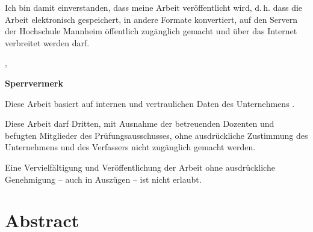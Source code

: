 %
{
\vspace{0.5cm}
Ich bin damit einverstanden, dass meine Arbeit veröffentlicht wird, d.\,h. dass die Arbeit elektronisch gespeichert, in andere Formate konvertiert, auf den Servern der Hochschule Mannheim öffentlich zugänglich gemacht und über das Internet verbreitet werden darf. 
}{}%


\vspace{1cm}
\dhbwort, \dhbwdatum \\

\vspace{1.2cm}						                                      
\dhbwautor

%
{%
\vspace{11cm}
\color{red}\textsf{\large\textbf{Sperrvermerk}}

Diese Arbeit basiert auf internen und vertraulichen Daten des Unternehmens \dhbwfirma.

Diese Arbeit darf Dritten, mit Ausnahme der betreuenden Dozenten und befugten Mitglieder des Prüfungsausschusses, ohne ausdrückliche Zustimmung des Unternehmens und des Verfassers nicht zugänglich gemacht werden.

Eine Vervielfältigung und Veröffentlichung der Arbeit ohne ausdrückliche Genehmigung -- auch in Auszügen -- ist nicht erlaubt.
\color{black}
}{}

\cleardoublepage

\chapter*{Abstract}

%
  {\subsubsection*{\dhbwtitelde}\dhbwabstractde\subsubsection*{\dhbwtitelen}\dhbwabstracten}
  {\subsubsection*{\dhbwtitelen}\dhbwabstracten\subsubsection*{\dhbwtitelde}\dhbwabstractde}

